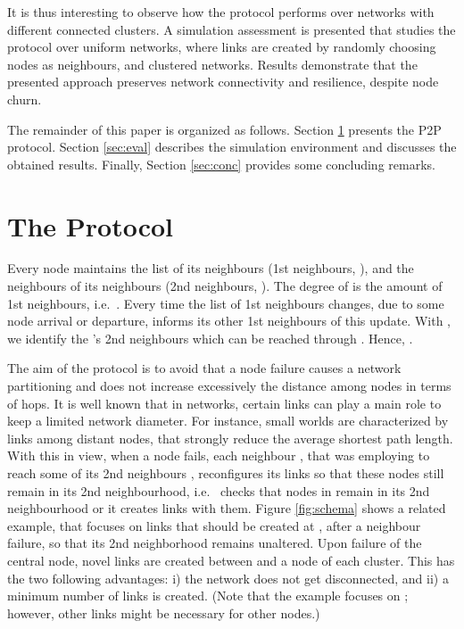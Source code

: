 \documentclass{www13-companion-accepted}
\begin{document}
It is thus interesting to observe how the protocol performs over networks with different connected clusters. 
A simulation assessment is presented that studies the protocol over uniform networks, where links are created by randomly choosing nodes as neighbours, and clustered networks. Results demonstrate that the presented approach preserves network connectivity and resilience, despite node churn.


The remainder of this paper is organized as follows. Section \ref{sec:prot} presents the P2P protocol. Section \ref{sec:eval} describes the simulation environment and discusses the obtained results. Finally, Section \ref{sec:conc} provides some concluding remarks.


\section{The Protocol}\label{sec:prot}


Every node  maintains the list of its neigh\-bours (1st neighbours, ), and the neighbours of its neighbours (2nd neigh\-bours, ).
The degree of  is the amount of 1st neighbours, i.e.~. Every time the list of 1st neighbours 
changes, due to some node arrival or departure,  informs its other 1st neighbours of this update.
With , we identify the 's 2nd neighbours which can be reached through . Hence, .


The aim of the protocol is to avoid that a node failure causes a network partitioning and does not increase excessively the distance among nodes in terms of hops. 
It is well known that in networks, certain links can play a main role to keep a limited network diameter. For instance, small worlds are characterized by links among distant nodes, that strongly reduce the average shortest path length.
With this in view, when a node  fails, each neighbour , that was employing  to reach some of its 2nd neighbours , reconfigures its links so that these nodes still remain in its 2nd neighbourhood, i.e.~ checks that nodes in  remain in its 2nd neighbourhood or it creates links with them. 
Figure \ref{fig:schema} shows a related example, that focuses on links that should be created at , after a neighbour failure, so that its 2nd neighborhood remains unaltered. Upon failure of the central node, novel links are created between  and a node of each cluster. This has the two following advantages: i) the network does not get disconnected, and ii) a minimum number of links is created. (Note that the example focuses on ; however, other links might be necessary for other nodes.)
\end{document}
